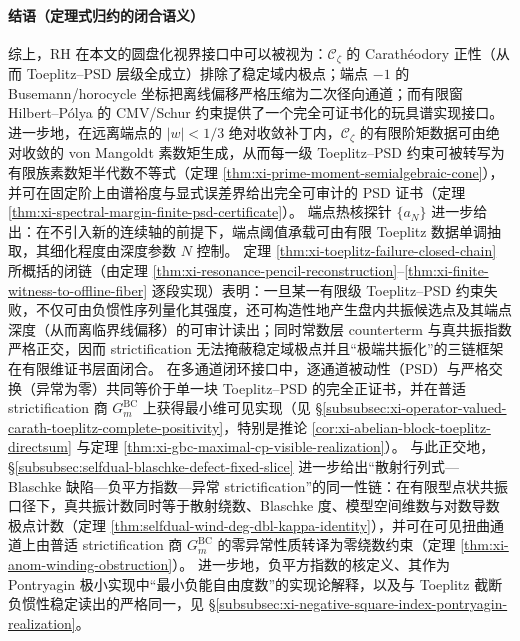 \paragraph{结语（定理式归约的闭合语义）}
综上，RH 在本文的圆盘化视界接口中可以被视为：\(\mathscr{C}_{\zeta}\) 的 Carath\'eodory 正性（从而 Toeplitz--PSD 层级全成立）排除了稳定域内极点；端点 \(-1\) 的 Busemann/horocycle 坐标把离线偏移严格压缩为二次径向通道；而有限窗 Hilbert--P{\'o}lya 的 CMV/Schur 约束提供了一个完全可证书化的玩具谱实现接口。
进一步地，在远离端点的 \(|w|<1/3\) 绝对收敛补丁内，\(\mathscr{C}_{\zeta}\) 的有限阶矩数据可由绝对收敛的 von Mangoldt 素数矩生成，从而每一级 Toeplitz--PSD 约束可被转写为有限族素数矩半代数不等式（定理 \ref{thm:xi-prime-moment-semialgebraic-cone}），并可在固定阶上由谱裕度与显式误差界给出完全可审计的 PSD 证书（定理 \ref{thm:xi-spectral-margin-finite-psd-certificate}）。
端点热核探针 \(\{a_N\}\) 进一步给出：在不引入新的连续轴的前提下，端点阈值承载可由有限 Toeplitz 数据单调抽取，其细化程度由深度参数 \(N\) 控制。
定理 \ref{thm:xi-toeplitz-failure-closed-chain} 所概括的闭链（由定理 \ref{thm:xi-resonance-pencil-reconstruction}--\ref{thm:xi-finite-witness-to-offline-fiber} 逐段实现）表明：一旦某一有限级 Toeplitz--PSD 约束失败，不仅可由负惯性序列量化其强度，还可构造性地产生盘内共振候选点及其端点深度（从而离临界线偏移）的可审计读出；同时常数层 counterterm 与真共振指数严格正交，因而 strictification 无法掩蔽稳定域极点并且“极端共振化”的三链框架在有限维证书层面闭合。
在多通道闭环接口中，逐通道被动性（PSD）与严格交换（异常为零）共同等价于单一块 Toeplitz--PSD 的完全正证书，并在普适 strictification 商 \(G^{\mathrm{BC}}_m\) 上获得最小维可见实现（见 \S\ref{subsubsec:xi-operator-valued-carath-toeplitz-complete-positivity}，特别是推论 \ref{cor:xi-abelian-block-toeplitz-directsum} 与定理 \ref{thm:xi-gbc-maximal-cp-visible-realization}）。
与此正交地，\S\ref{subsubsec:selfdual-blaschke-defect-fixed-slice} 进一步给出“散射行列式—Blaschke 缺陷—负平方指数—异常 strictification”的同一性链：在有限型点状共振口径下，真共振计数同时等于散射绕数、Blaschke 度、模型空间维数与对数导数极点计数（定理 \ref{thm:selfdual-wind-deg-dbl-kappa-identity}），并可在可见扭曲通道上由普适 strictification 商 \(G^{\mathrm{BC}}_m\) 的零异常性质转译为零绕数约束（定理 \ref{thm:xi-anom-winding-obstruction}）。
进一步地，负平方指数的核定义、其作为 Pontryagin 极小实现中“最小负能自由度数”的实现论解释，以及与 Toeplitz 截断负惯性稳定读出的严格同一，见 \S\ref{subsubsec:xi-negative-square-index-pontryagin-realization}。

\endinput
